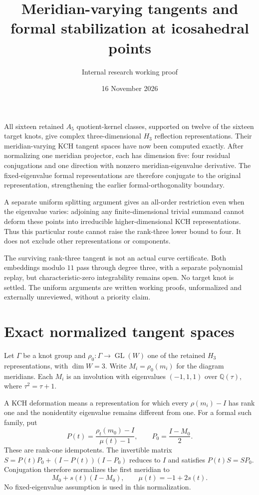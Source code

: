 \documentclass[11pt]{article}
\title{Meridian-varying tangents and formal stabilization at icosahedral points}
\author{Internal research working proof}
\date{16 November 2026}
\newcommand{\GL}{\operatorname{GL}}
\begin{document}
\maketitle

All sixteen retained $A_5$ quotient-kernel classes, supported on
twelve of the sixteen target knots, give complex three-dimensional
$H_3$ reflection representations. Their meridian-varying KCH
tangent spaces have now been computed exactly. After normalizing
one meridian projector, each has dimension five: four residual
conjugations and one direction with nonzero meridian-eigenvalue
derivative. The fixed-eigenvalue formal representations are therefore
conjugate to the original representation, strengthening the earlier
formal-orthogonality boundary.

A separate uniform splitting argument gives an all-order restriction
even when the eigenvalue varies: adjoining any finite-dimensional
trivial summand cannot deform these points into irreducible
higher-dimensional KCH representations. Thus this particular route
cannot raise the rank-three lower bound to four. It does not exclude
other representations or components.

The surviving rank-three tangent is not an actual curve certificate.
Both embeddings modulo $11$ pass through degree three, with a separate
polynomial replay, but characteristic-zero integrability remains open.
No target knot is settled. The uniform arguments are written working
proofs, unformalized and externally unreviewed, without a priority claim.

\section{Exact normalized tangent spaces}

Let $\Gamma$ be a knot group and $\rho_0:\Gamma\to\GL(W)$ one
of the retained $H_3$ representations, with $\dim W=3$. Write
$M_i=\rho_0(m_i)$ for the diagram meridians. Each $M_i$ is an
involution with eigenvalues $(-1,1,1)$ over
$\mathbb Q(\tau)$, where $\tau^2=\tau+1$.

A KCH deformation means a representation for which every
$\rho(m_i)-I$ has rank one and the nonidentity eigenvalue remains
different from one. For a formal such family, put
\[
 P(t)=\frac{\rho_t(m_0)-I}{\mu(t)-1},\qquad
 P_0=\frac{I-M_0}{2}.
\]
These are rank-one idempotents. The invertible matrix
$S=P(t)P_0+(I-P(t))(I-P_0)$ reduces to $I$ and satisfies
$P(t)S=SP_0$. Conjugation therefore normalizes the first meridian to
\begin{equation}\label{eq:normalize}
 M_0+s(t)(I-M_0),\qquad \mu(t)=-1+2s(t).
\end{equation}
No fixed-eigenvalue assumption is used in this normalization.
\end{document}
